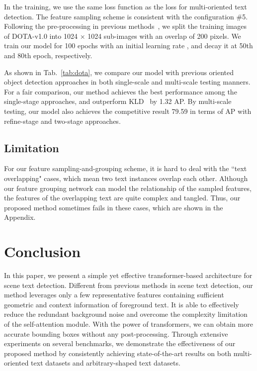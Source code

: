 \documentclass[10pt,twocolumn,letterpaper]{article}
\begin{document}
In the training, we use the same loss function as the loss for multi-oriented text detection. The feature sampling scheme is consistent with the configuration \#5.
Following the pre-processing in previous methods~\cite{KLD,GWD}, we split the training images of DOTA-v1.0 into 1024 × 1024 sub-images with an overlap of 200 pixels. We train our model for 100 epochs with an initial learning rate , and decay it at 50th and 80th epoch, respectively.

As shown in Tab.~\ref{tab:dota}, we compare our model with previous oriented object detection approaches in both single-scale and multi-scale testing manners. For a fair comparison, our method achieves the best performance among the single-stage approaches, and outperform KLD~\cite{KLD} by 1.32 AP.
By multi-scale testing, our model also achieves the competitive result 79.59 in terms of AP with refine-stage and two-stage approaches.


\subsection{Limitation}
For our feature sampling-and-grouping scheme, it is hard to deal with the ``text overlapping" cases, which mean two text instances overlap each other.
Although our feature grouping network can model the relationship of the sampled features, the features of the overlapping text are quite complex and tangled. Thus, our proposed method sometimes fails in these cases, which are shown in the Appendix.




\section{Conclusion}
\label{sec:conclusion}
In this paper, we present a simple yet effective transformer-based architecture for scene text detection.
Different from previous methods in scene text detection, our method leverages only a few representative features containing sufficient geometric and context information of foreground text.
It is able to effectively reduce the redundant background noise and overcome the complexity limitation of the self-attention module.
With the power of transformers, we can obtain more accurate bounding boxes without any post-processing.
Through extensive experiments on several benchmarks, we demonstrate the effectiveness of our proposed method by consistently achieving state-of-the-art results on both multi-oriented text datasets and arbitrary-shaped text datasets.
\end{document}
